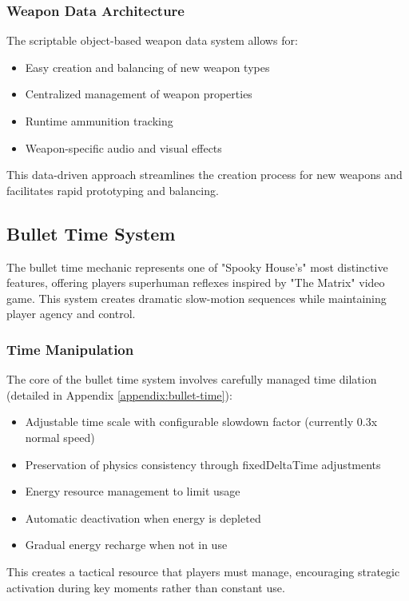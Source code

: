 \documentclass{article}
\begin{document}
    \subsubsection{Weapon Data Architecture}
    The scriptable object-based weapon data system allows for:

    \begin{itemize}
        \item Easy creation and balancing of new weapon types
        \item Centralized management of weapon properties
        \item Runtime ammunition tracking
        \item Weapon-specific audio and visual effects
    \end{itemize}

    This data-driven approach streamlines the creation process for new weapons and facilitates rapid prototyping and balancing.

    \subsection{Bullet Time System}
    The bullet time mechanic represents one of "Spooky House's" most distinctive features, offering players superhuman reflexes inspired by "The Matrix" video game. This system creates dramatic slow-motion sequences while maintaining player agency and control.

    \subsubsection{Time Manipulation}
    The core of the bullet time system involves carefully managed time dilation (detailed in Appendix \ref{appendix:bullet-time}):

    \begin{itemize}
        \item Adjustable time scale with configurable slowdown factor (currently 0.3x normal speed)
        \item Preservation of physics consistency through fixedDeltaTime adjustments
        \item Energy resource management to limit usage
        \item Automatic deactivation when energy is depleted
        \item Gradual energy recharge when not in use
    \end{itemize}

    This creates a tactical resource that players must manage, encouraging strategic activation during key moments rather than constant use.
\end{document}
